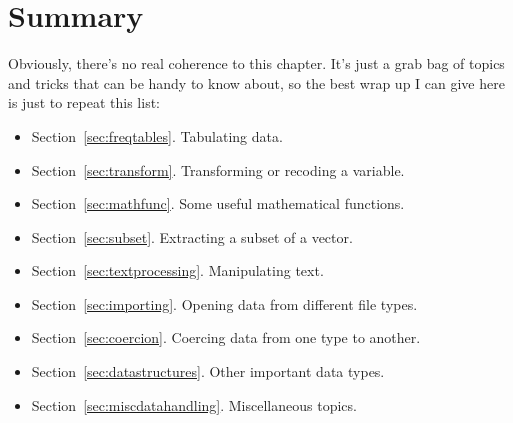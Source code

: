 \section{Summary}

Obviously, there's no real coherence to this chapter. It's just a grab bag of topics and tricks that can be handy to know about, so the best wrap up I can give here is just to repeat this list:

\begin{itemize} \itemsep 0pt
\item Section~\ref{sec:freqtables}. Tabulating data.
\item Section~\ref{sec:transform}. Transforming or recoding a variable.
\item Section~\ref{sec:mathfunc}. Some useful mathematical functions.
\item Section~\ref{sec:subset}. Extracting a subset of a vector.
\item Section~\ref{sec:textprocessing}. Manipulating text.
\item Section~\ref{sec:importing}. Opening data from different file types.
\item Section~\ref{sec:coercion}. Coercing data from one type to another.
\item Section~\ref{sec:datastructures}. Other important data types.
\item Section~\ref{sec:miscdatahandling}. Miscellaneous topics.
\end{itemize}



